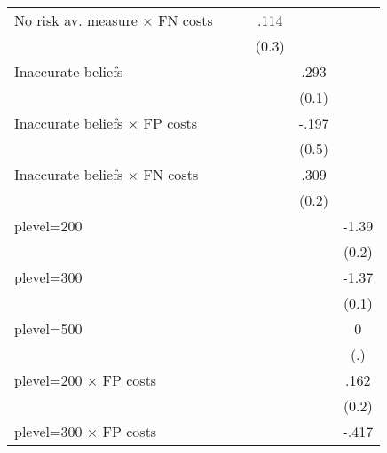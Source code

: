 \begin{table}[htbp]
\begin{tabular}{l*{5}{c}}
No risk av. measure $\times$ FN costs&                  &                  &     .114         &                  &                  \\
                &                  &                  &    (0.3)         &                  &                  \\
Inaccurate beliefs&                  &                  &                  &     .293\sym{**} &                  \\
                &                  &                  &                  &    (0.1)         &                  \\
Inaccurate beliefs $\times$ FP costs&                  &                  &                  &    -.197         &                  \\
                &                  &                  &                  &    (0.5)         &                  \\
Inaccurate beliefs $\times$ FN costs&                  &                  &                  &     .309         &                  \\
                &                  &                  &                  &    (0.2)         &                  \\
plevel=200      &                  &                  &                  &                  &    -1.39\sym{***}\\
                &                  &                  &                  &                  &    (0.2)         \\
plevel=300      &                  &                  &                  &                  &    -1.37\sym{***}\\
                &                  &                  &                  &                  &    (0.1)         \\
plevel=500      &                  &                  &                  &                  &        0         \\
                &                  &                  &                  &                  &      (.)         \\
plevel=200 $\times$ FP costs&                  &                  &                  &                  &     .162         \\
                &                  &                  &                  &                  &    (0.2)         \\
plevel=300 $\times$ FP costs&                  &                  &                  &                  &    -.417\sym{***}\\

\end{tabular}
\end{table}
